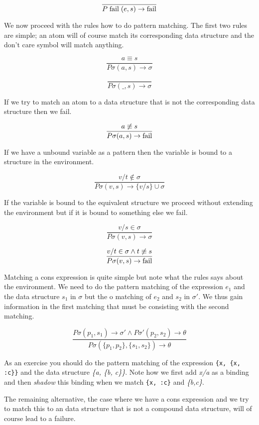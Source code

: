 \documentclass[a4paper,11pt]{article}
\begin{document}
$$\frac{}{P\;{\rm fail}\;(e, s) \rightarrow {\rm fail}}$$ 

We now proceed with the rules how to do pattern matching. The first
two rules are simple; an atom will of course match its corresponding
data structure and the don't care symbol will match anything.

$$\frac{a \equiv s}{P\sigma(a, s) \rightarrow \sigma}$$ 

$$\frac{}{P\sigma(\_,s) \rightarrow \sigma}$$

If we try to match an atom to a data structure that is not the
corresponding data structure then we fail.

$$\frac{a \not\equiv s}{P\sigma(a, s) \rightarrow {\rm fail}}$$ 

If we have a unbound variable as a pattern then the variable is bound to a
structure in the environment. 

$$\frac{v/t \not\in \sigma}{P\sigma(v, s) \rightarrow \lbrace v/s \rbrace \cup \sigma }$$ 

If the variable is bound to the equivalent structure we proceed
without extending the environment but if it is bound to something else
we fail.

$$\frac{v/s \in \sigma}{P\sigma(v, s) \rightarrow \sigma  }$$

$$\frac{v/t \in \sigma \wedge t \not\equiv s}{P\sigma(v, s) \rightarrow  {\rm fail} }$$ 

Matching a cons expression is quite simple but note what the rules
says about the environment. We need to do the pattern matching of the
expression $e_1$ and the data structure $s_1$ in $\sigma$ but the o
matching of $e_2$ and $s_2$ in $\sigma'$. We thus gain information in
the first matching that must be consisting with the second matching.

$$\frac{P\sigma(p_1, s_1) \rightarrow \sigma' \wedge P\sigma'(p_2, s_2) \rightarrow \theta}{P\sigma(\lbrace p_1, p_2 \rbrace  , \lbrace s_1, s_2 \rbrace) \rightarrow \theta}$$

As an exercise you should do the pattern matching of the expression
{\tt \{x, \{x, :c\}\}} and the data structure {\em \{a, \{b, c\}\}}. Note
how we first add {\em x/a} as a binding and then {\em shadow} this binding when
we match {\tt \{x, :c\}} and {\em \{b,c\}}.

The remaining alternative, the case where we have a cons expression and
we try to match this to an data structure that is not a compound data
structure, will of course lead to a failure.
\end{document}
